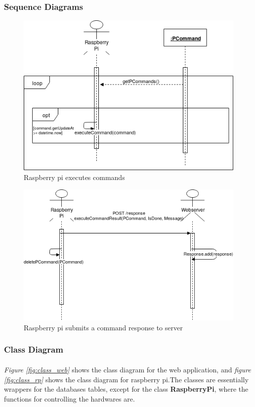 \documentclass[12pt, oneside, a4paper]{book}
\begin{document}
				\subsubsection{Sequence Diagrams}
				\begin{figure}[H]
					\caption{Raspberry pi executes commands}
					\includegraphics[width=\linewidth]{img/sequence_execute.png}
				\end{figure}
				\begin{figure}[H]
					\caption{Raspberry pi submits a command response to server}
					\includegraphics[width=\linewidth]{img/sequence_submit_response.png}
				\end{figure}
				\newpage\subsubsection{Class Diagram}
					\paragraph{} \textit{Figure \ref{fig:class_web}} shows the class diagram for the web application, and \textit{figure \ref{fig:class_rp}} shows the class diagram for raspberry pi.The classes are essentially wrappers for the databases tables, except for the class \textbf{RaspberryPi}, where the functions for controlling the hardwares are.
\end{document}
